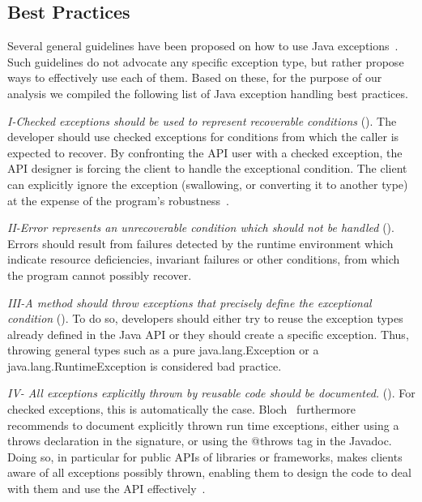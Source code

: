 \documentclass[conference]{IEEEtran}
\begin{document}
\subsection{Best Practices}
\label{sec:best}

Several general guidelines have been proposed on how to use Java
exceptions~\cite{mandrioli1992advances,gosling2000java,wirfs2006toward,
bloch2008effective}. Such guidelines do not
advocate any specific exception type, but rather propose ways to effectively use each of them.
Based on these, for the purpose of our analysis we compiled the following list of Java exception handling best practices.


\emph{I-Checked exceptions should be used to represent recoverable
conditions} (\cite{mandrioli1992advances,gosling2000java,wirfs2006toward,bloch2008effective}).
The developer should use checked exceptions for conditions from which the caller
is expected to recover. By confronting the API user with a checked exception,
the API designer is forcing the client to handle the exceptional condition. The
client can explicitly ignore the exception (swallowing, or converting it to
another type) at the expense of the program's robustness~\cite{gosling2000java}.

\emph{II-Error represents an unrecoverable condition which should not be handled} 
(\cite{gosling2000java}).  Errors should result from failures detected
by the runtime environment which indicate resource deficiencies, invariant
failures or other conditions, from which the program cannot possibly recover.


\emph{III-A method should throw exceptions that precisely define the
exceptional condition} (\cite{gosling2000java,bloch2008effective}). To do so,
developers should either try to reuse the exception types already defined in the
Java API or they should create a specific exception. Thus, throwing general types such as a
pure java.lang.Exception or a java.lang.RuntimeException is considered bad practice.


\emph{IV- All exceptions explicitly thrown by reusable code should be documented.}
(\cite{mandrioli1992advances,gosling2000java,wirfs2006toward,bloch2008effective}).
For checked exceptions, this is automatically the case.
Bloch~\cite{bloch2008effective} furthermore recommends to document explicitly thrown
run time exceptions, either using a throws declaration in the signature, or using
the @throws tag in the Javadoc.
Doing so, in particular for public APIs of libraries or frameworks,
makes clients aware of all exceptions possibly thrown,
enabling them to design the code to deal with them and use the API effectively~\cite{Robil00,wirfs2006toward}.
\end{document}
